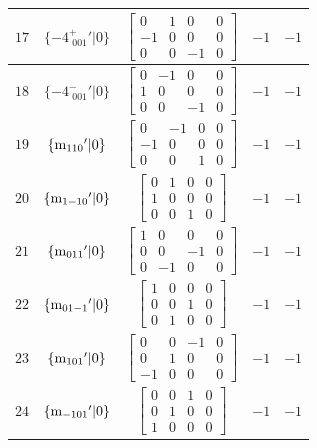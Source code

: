 \documentclass[fleqn,8pt]{jsarticle}
\begin{document}
\begin{longtable}{ccccc}
$ 17 $ & $ \{-4^{+}_{\,\,001}{}'|0\} $ & $ \begin{bmatrix} 0 & 1 & 0 & 0 \\ -1 & 0 & 0 & 0 \\ 0 & 0 & -1 & 0 \end{bmatrix} $ & $ -1 $ & $ -1 $ \\ \hline
$ 18 $ & $ \{-4^{-}_{\,\,001}{}'|0\} $ & $ \begin{bmatrix} 0 & -1 & 0 & 0 \\ 1 & 0 & 0 & 0 \\ 0 & 0 & -1 & 0 \end{bmatrix} $ & $ -1 $ & $ -1 $ \\ \hline
$ 19 $ & $ \{{\rm m}_{110}{}'|0\} $ & $ \begin{bmatrix} 0 & -1 & 0 & 0 \\ -1 & 0 & 0 & 0 \\ 0 & 0 & 1 & 0 \end{bmatrix} $ & $ -1 $ & $ -1 $ \\ \hline
$ 20 $ & $ \{{\rm m}_{1-10}{}'|0\} $ & $ \begin{bmatrix} 0 & 1 & 0 & 0 \\ 1 & 0 & 0 & 0 \\ 0 & 0 & 1 & 0 \end{bmatrix} $ & $ -1 $ & $ -1 $ \\ \hline
$ 21 $ & $ \{{\rm m}_{011}{}'|0\} $ & $ \begin{bmatrix} 1 & 0 & 0 & 0 \\ 0 & 0 & -1 & 0 \\ 0 & -1 & 0 & 0 \end{bmatrix} $ & $ -1 $ & $ -1 $ \\ \hline
$ 22 $ & $ \{{\rm m}_{01-1}{}'|0\} $ & $ \begin{bmatrix} 1 & 0 & 0 & 0 \\ 0 & 0 & 1 & 0 \\ 0 & 1 & 0 & 0 \end{bmatrix} $ & $ -1 $ & $ -1 $ \\ \hline
$ 23 $ & $ \{{\rm m}_{101}{}'|0\} $ & $ \begin{bmatrix} 0 & 0 & -1 & 0 \\ 0 & 1 & 0 & 0 \\ -1 & 0 & 0 & 0 \end{bmatrix} $ & $ -1 $ & $ -1 $ \\ \hline
$ 24 $ & $ \{{\rm m}_{-101}{}'|0\} $ & $ \begin{bmatrix} 0 & 0 & 1 & 0 \\ 0 & 1 & 0 & 0 \\ 1 & 0 & 0 & 0 \end{bmatrix} $ & $ -1 $ & $ -1 $ \\
\end{longtable}
\end{document}

